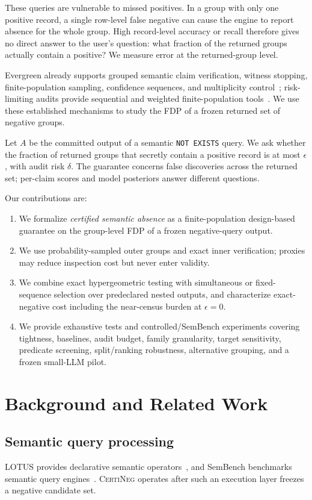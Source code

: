 \documentclass[runningheads]{llncs}
\newcommand{\CN}{\textsc{CertiNeg}\xspace}
\begin{document}
These queries are vulnerable to missed positives. In a group with only one positive record, a single row-level false negative can cause the engine to report absence for the whole group. High record-level accuracy or recall therefore gives no direct answer to the user's question: what fraction of the returned groups actually contain a positive? We measure error at the returned-group level.

Evergreen already supports grouped semantic claim verification, witness stopping, finite-population sampling, confidence sequences, and multiplicity control~\cite{evergreen2026}; risk-limiting audits provide sequential and weighted finite-population tools~\cite{alpha2023,rlfa2023}. We use these established mechanisms to study the FDP of a frozen returned set of negative groups.

Let $A$ be the committed output of a semantic \texttt{NOT EXISTS} query. We ask whether the fraction of returned groups that secretly contain a positive record is at most $\epsilon$, with audit risk $\delta$. The guarantee concerns false discoveries across the returned set; per-claim scores and model posteriors answer different questions.

Our contributions are:
\begin{enumerate}
\item We formalize \emph{certified semantic absence} as a finite-population design-based guarantee on the group-level FDP of a frozen negative-query output.
\item We use probability-sampled outer groups and exact inner verification; proxies may reduce inspection cost but never enter validity.
\item We combine exact hypergeometric testing with simultaneous or fixed-sequence selection over predeclared nested outputs, and characterize exact-negative cost including the near-census burden at $\epsilon=0$.
\item We provide exhaustive tests and controlled/SemBench experiments covering tightness, baselines, audit budget, family granularity, target sensitivity, predicate screening, split/ranking robustness, alternative grouping, and a frozen small-LLM pilot.
\end{enumerate}


\section{Background and Related Work}
\subsection{Semantic query processing}
LOTUS provides declarative semantic operators~\cite{lotus2025}, and SemBench benchmarks semantic query engines~\cite{sembench2026}. \CN operates after such an execution layer freezes a negative candidate set.
\end{document}
